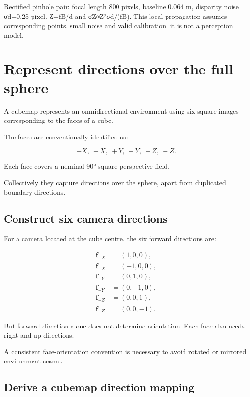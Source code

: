 Rectified pinhole pair: focal length 800 pixels, baseline 0.064 m, disparity noise σd=0.25 pixel. Z=fB/d and σZ≈Z²σd/(fB). This local propagation assumes corresponding points, small noise and valid calibration; it is not a perception model.

\section{Represent directions over the full sphere}\label{02-foundations-ii-ch035-represent-directions-over-the-full-sphere}

A cubemap represents an omnidirectional environment using six square images corresponding to the faces of a cube.

The faces are conventionally identified as:

\[ \boxed{+X,\ -X,\ +Y,\ -Y,\ +Z,\ -Z}. \]

Each face covers a nominal 90° square perspective field.

Collectively they capture directions over the sphere, apart from duplicated boundary directions.

\subsection{Construct six camera directions}\label{02-foundations-ii-ch035-construct-six-camera-directions}

For a camera located at the cube centre, the six forward directions are:

\[ \begin{aligned} \mathbf f_{+X}&=(1,0,0),\\ \mathbf f_{-X}&=(-1,0,0),\\ \mathbf f_{+Y}&=(0,1,0),\\ \mathbf f_{-Y}&=(0,-1,0),\\ \mathbf f_{+Z}&=(0,0,1),\\ \mathbf f_{-Z}&=(0,0,-1). \end{aligned} \]

But forward direction alone does not determine orientation. Each face also needs right and up directions.

A consistent face-orientation convention is necessary to avoid rotated or mirrored environment seams.

\subsection{Derive a cubemap direction mapping}\label{02-foundations-ii-ch035-derive-a-cubemap-direction-mapping}

